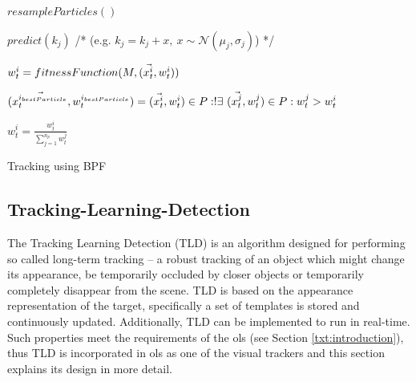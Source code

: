 \begin{algorithm}
	\SetAlgoNoLine	
	\DontPrintSemicolon
	
	\BlankLine
	
	$resampleParticles()$\;
	
	\BlankLine
	{
		{		
			$predict(k_{j})$ /* (e.g. $k_{j} = k_{j} + x, ~ x \sim \mathcal{N}(\mu_{j}, \sigma_{j})$) */ \;
		}
	}
	
	\BlankLine
	{
		$w_{t}^{i} = fitnessFunction(M, (\vec{x_{t}^{i}},w_{t}^{i}))$\;
	}
	
	\BlankLine
	$(\vec{x_{t}^{i_{bestParticle}}},w_{t}^{i_{bestParticle}}) = (\vec{x_{t}^{i}},w_{t}^{i}) \in P : !\exists ~ (\vec{x_{t}^{j}},w_{t}^{j}) \in P : w_{t}^{j} > w_{t}^{i}$\;
	
	\BlankLine	
	{
		$w_{t}^{i} = \frac{w_{t}^{i}}{\sum_{j = 1}^{n_{p}}w_{t}^{j}}$
	}
	
	
	\caption{Tracking using BPF}
	\label{alg:bpf}
\end{algorithm}

\subsection{Tracking-Learning-Detection} \label{txt:tracking_learning_detection}

The Tracking Learning Detection (TLD) \cite{Kalal:2012:TRA:2225045.2225082} is an algorithm designed for performing so called long-term tracking -- a robust tracking of an object which might change its appearance, be temporarily occluded by closer objects or temporarily completely disappear from the scene. TLD is based on the appearance representation of the target, specifically a set of templates is stored and continuously updated. Additionally, TLD can be implemented to run in real-time. Such properties meet the requirements of the \gls{ols} (see Section \ref{txt:introduction}), thus TLD is incorporated in \gls{ols} as one of the visual trackers and this section explains its design in more detail.

